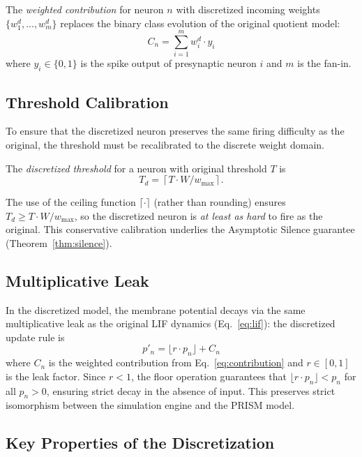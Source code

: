 \documentclass[runningheads]{llncs}
\begin{document}
The \emph{weighted contribution} for neuron $n$ with discretized incoming weights
$\{w_1^d, \dots, w_m^d\}$ replaces the binary class evolution of the original
quotient model:
\begin{equation}\label{eq:contribution}
C_n = \sum_{i=1}^{m} w_i^d \cdot y_i
\end{equation}
where $y_i \in \{0,1\}$ is the spike output of presynaptic neuron $i$ and $m$ is
the fan-in.

\subsection{Threshold Calibration}\label{sec:threshold-cal}

To ensure that the discretized neuron preserves the same firing difficulty as the
original, the threshold must be recalibrated to the discrete weight domain.

\begin{definition}
The \emph{discretized threshold} for a neuron with original threshold $T$ is
\[
T_d = \left\lceil T \cdot W / w_{\max} \right\rceil .
\]
\end{definition}

The use of the ceiling function $\lceil \cdot \rceil$ (rather than rounding)
ensures $T_d \geq T \cdot W / w_{\max}$, so the discretized neuron is \emph{at
least as hard} to fire as the original. This conservative calibration underlies
the Asymptotic Silence guarantee (Theorem~\ref{thm:silence}).

\subsection{Multiplicative Leak}\label{sec:leak}

In the discretized model, the membrane potential decays via the same
multiplicative leak as the original LIF dynamics (Eq.~\ref{eq:lif}): the
discretized update rule is
\begin{equation}\label{eq:leak}
p'_n = \lfloor r \cdot p_n \rfloor + C_n
\end{equation}
where $C_n$ is the weighted contribution from Eq.~\ref{eq:contribution} and
$r \in [0,1]$ is the leak factor. Since $r < 1$, the floor operation guarantees
that $\lfloor r \cdot p_n \rfloor < p_n$ for all $p_n > 0$, ensuring strict decay
in the absence of input. This preserves strict isomorphism between the simulation
engine and the PRISM model.

\subsection{Key Properties of the Discretization}\label{sec:proofs}
\end{document}
